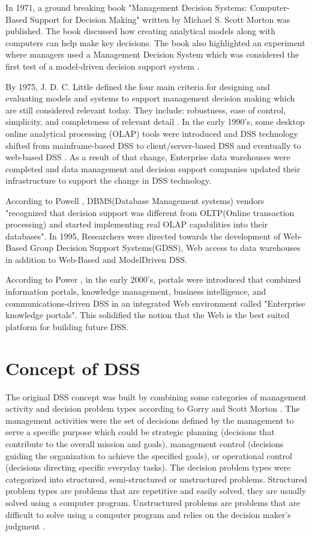 \indent In 1971, a ground breaking book "Management Decision Systems: Computer-Based Support for Decision Making" written by Michael S. Scott Morton was published. The book discussed how creating analytical models along with computers can help make key decisions. The book also highlighted an experiment where managers used a Management Decision System which was considered the first test of a model-driven decision support system \cite{power2007brief}.

\indent By 1975, J. D. C. Little defined the four main criteria for designing and evaluating models and systems to support management decision making which are still considered relevant today. They include: robustness, ease of control, simplicity, and completeness of relevant detail \cite{power2007brief}. In the early 1990's, some desktop online analytical processing (OLAP) tools were introduced and DSS technology shifted from mainframe-based DSS to client/server-based DSS and eventually to web-based DSS \cite{bhargava2001decision}. As a result of that change, Enterprise data warehouses were completed and data management and decision support companies updated their infrastructure to support the change in DSS technology.

\indent According to Powell \cite{powell2001dm}, DBMS(Database Management systems) vendors "recognized that decision support was different from OLTP(Online transaction processing) and started implementing real OLAP capabilities into their databases". In 1995, Researchers were directed towards the development of Web-Based Group Decision Support Systems(GDSS), Web access to data warehouses in addition to Web-Based and ModelDriven DSS.

According to Power \cite{power2007brief}, in the early 2000's, portals were introduced that combined information portals, knowledge management, business intelligence, and communications-driven DSS in an integrated Web environment called "Enterprise knowledge portals". This solidified the notion that the Web is the best suited platform for building future DSS.
\section{Concept of DSS}
\label{sec:FoundationsConcept}
\indent The original DSS concept was built by combining some categories of management activity and decision problem types according to Gorry and Scott Morton \cite{gorry1989framework}. The management activities were the set of decisions defined by the management to serve a specific purpose which could be strategic planning (decisions that contribute to the overall mission and goals), management control (decisions guiding the organization to achieve the specified goals), or operational control (decisions directing specific everyday tasks). The decision problem types were categorized into structured, semi-structured or unstructured problems. Structured problem types are problems that are repetitive and easily solved, they are usually solved using a computer program. Unstructured problems are problems that are difficult to solve using a computer program and relies on the decision maker's judgment \cite{shim2002past}.

